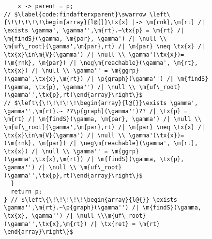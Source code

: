 \begin{figure}[t]
\begin{lstlisting}
    x -> parent = p;
// $\label{code:findafterxparent}\swarrow \left\{\!\!\!\!\!\begin{array}{l@{}}\tx{x} |-> \m{rnk},\m{rt} /| \exists \gamma', \gamma'',\m{rt}.~\tx{p} = \m{rt} /| \m{findS}(\gamma, \m{par}, \gamma') /| \null \\ \m{uf\_root}(\gamma',\m{par},rt) /| \m{par} \neq \tx{x} /| \tx{x}\in\m{V}(\gamma') /| \null \\ \gamma'(\tx{x})=(\m{rnk}, \m{par}) /| \neg\m{reachable}(\gamma', \m{rt}, \tx{x}) /| \null \\ \gamma'' = \m{ggrp}(\gamma',\tx{x},\m{rt}) /| \p{graph}(\gamma'') /| \m{findS}(\gamma, \tx{p}, \gamma'') /| \null \\ \m{uf\_root}(\gamma'',\tx{p},rt)\end{array}\right\}$
// $\left\{\!\!\!\!\!\begin{array}{l@{}}\exists \gamma', \gamma'',\m{rt}.~ ??\p{graph}(\gamma'')?? /| \tx{p} = \m{rt} /| \m{findS}(\gamma, \m{par}, \gamma') /| \null \\ \m{uf\_root}(\gamma',\m{par},rt) /| \m{par} \neq \tx{x} /| \tx{x}\in\m{V}(\gamma') /| \null \\ \gamma'(\tx{x})=(\m{rnk}, \m{par}) /| \neg\m{reachable}(\gamma', \m{rt}, \tx{x}) /| \null \\ \gamma'' = \m{ggrp}(\gamma',\tx{x},\m{rt}) /| \m{findS}(\gamma, \tx{p}, \gamma'') /| \null \\ \m{uf\_root}(\gamma'',\tx{p},rt)\end{array}\right\}$
  } 
  return p;
} // $\left\{\!\!\!\!\!\begin{array}{l@{}} \exists \gamma'',\m{rt}.~\p{graph}(\gamma'') /| \m{findS}(\gamma, \tx{x}, \gamma'') /| \null \\\m{uf\_root}(\gamma'',\tx{x},\m{rt}) /| \tx{ret} = \m{rt}  \end{array}\right\}$ 
\end{lstlisting}






\end{figure}
